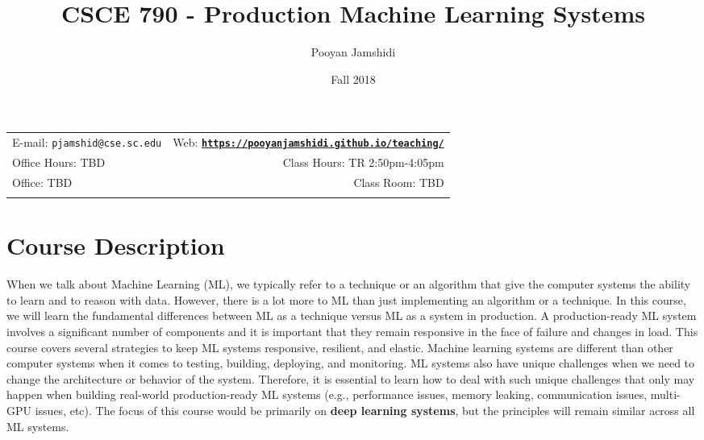 \documentclass[11pt]{article}
\title{CSCE 790 - Production Machine Learning Systems}
\author{Pooyan Jamshidi}
\date{Fall 2018}
\newcommand{\blankline}{\quad\pagebreak[2]}
\begin{document}
\maketitle

\blankline

\begin{tabular*}{.93\textwidth}{@{\extracolsep{\fill}}lr}


  E-mail: \texttt{pjamshid@cse.sc.edu} & Web: \href{https://pooyanjamshidi.github.io/teaching/}{\tt\bf https://pooyanjamshidi.github.io/teaching/}  \\

 Office Hours: TBD  &  Class Hours: TR 2:50pm-4:05pm \\


 Office: TBD & Class Room: TBD \\
&  \\
\hline
\end{tabular*}

\vspace{10mm}

\section*{Course Description}

When we talk about Machine Learning (ML), we typically refer to a technique or an algorithm that give the computer systems the ability to learn and to reason with data. However, there is a lot more to ML than just implementing an algorithm or a technique. In this course, we will learn the fundamental differences between ML as a technique versus ML as a system in production. A production-ready ML system involves a significant number of components and it is important that they remain responsive in the face of failure and changes in load. This course covers several strategies to keep ML systems responsive, resilient, and elastic. Machine learning systems are different than other computer systems when it comes to testing, building, deploying, and monitoring. ML systems also have unique challenges when we need to change the architecture or behavior of the system. Therefore, it is essential to learn how to deal with such unique challenges that only may happen when building real-world production-ready ML systems (e.g., performance issues, memory leaking, communication issues, multi-GPU issues, etc). The focus of this course would be primarily on \textbf{deep learning systems}, but the principles will remain similar across all ML systems. 
\end{document}
